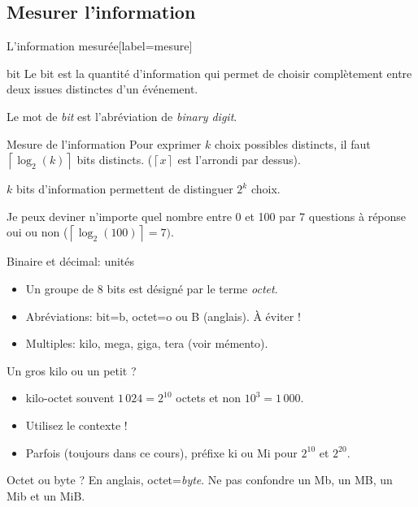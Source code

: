 \subsection{Mesurer l'information}
\begin{frame}{L'information mesurée}[label=mesure]
  \begin{block}{bit}
    Le bit est la quantité d'information qui permet de choisir
    complètement entre deux issues distinctes d'un événement.

    Le mot de \emph{bit} est l'abréviation de \emph{binary digit}.
  \end{block}
  \begin{block}{Mesure de l'information}
    Pour exprimer $k$ choix possibles distincts, il faut
    $\left\lceil\log_2(k)\right\rceil$ bits distincts. ($\left\lceil
      x\right\rceil$ est l'arrondi par dessus).

    $k$ bits d'information permettent de distinguer $2^k$ choix.
  \end{block}
  \begin{example}
    Je peux deviner n'importe quel nombre entre 0 et 100 par 7 questions
    à réponse oui ou non ($\left\lceil\log_2(100)\right\rceil=7)$.
    \begin{presentationonly}\hfill\hyperlink{fakira}{}\end{presentationonly}
  \end{example}
\end{frame}
\begin{frame}{Binaire et décimal: unités}
  \begin{itemize}
  \item Un groupe de 8 bits est désigné par le terme \emph{octet}.
  \item Abréviations: bit=b, octet=o ou B (anglais). À éviter !
  \item Multiples: kilo, mega, giga, tera (voir mémento).
  \end{itemize}
  \begin{alertblock}{Un gros kilo ou un petit ?}
    \begin{itemize}
    \item[\dialogwarning] kilo-octet souvent $1\,024=2^{10}$ octets et non $10^3=1\,000$.
    \item[\dialogsystem] Utilisez le contexte !
    \item[\dialoginformation] Parfois (toujours dans ce cours), préfixe ki ou Mi pour $2^{10}$ et $2^{20}$.
    \end{itemize}
  \end{alertblock}
  \begin{alertblock}{Octet ou byte ?}
    En anglais, octet=\emph{byte}.
    Ne pas confondre un Mb, un MB, un Mib et un MiB.
  \end{alertblock}
\end{frame}
